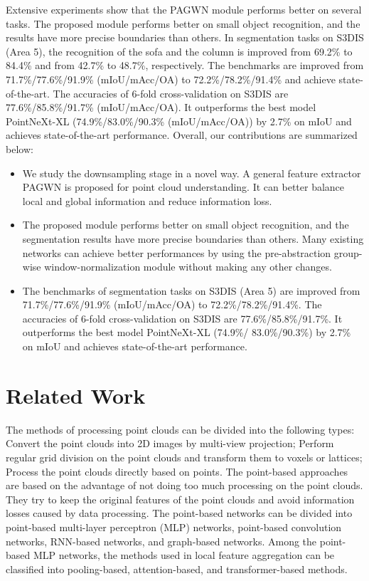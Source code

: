 \documentclass[10pt,twocolumn,letterpaper]{article}
\begin{document}
    Extensive experiments show that the PAGWN module performs better on several tasks.
    The proposed module performs better on small object recognition, and the results have more precise boundaries than others.
    In segmentation tasks on S3DIS (Area 5), the recognition of the sofa and the column is improved from 69.2\% to 84.4\% and from 42.7\% to 48.7\%, respectively.
    The benchmarks are improved from 71.7\%/77.6\%/91.9\% (mIoU/mAcc/OA) to 72.2\%/78.2\%/91.4\% and achieve state-of-the-art.
    The accuracies of 6-fold cross-validation on S3DIS are 77.6\%/85.8\%/91.7\% (mIoU/mAcc/OA). 
    It outperforms the best model PointNeXt-XL \cite{45https://doi.org/10.48550/arxiv.2206.04670} (74.9\%/83.0\%/90.3\% (mIoU/mAcc/OA)) by 2.7\% on mIoU and achieves state-of-the-art performance.
    Overall, our contributions are summarized below:
    \begin{itemize}
    \item We study the downsampling stage in a novel way. A general feature extractor PAGWN is proposed for point cloud understanding. It can better balance local and global information and reduce information loss.
    \item The proposed module performs better on small object recognition, and the segmentation results have more precise boundaries than others. Many existing networks can achieve better performances by using the pre-abstraction group-wise window-normalization module without making any other changes.
    \item The benchmarks of segmentation tasks on S3DIS (Area 5) are improved from 71.7\%/77.6\%/91.9\% (mIoU/mAcc/OA) to 72.2\%/78.2\%/91.4\%. The accuracies of 6-fold cross-validation on S3DIS are 77.6\%/85.8\%/91.7\%. It outperforms the best model PointNeXt-XL \cite{45https://doi.org/10.48550/arxiv.2206.04670} (74.9\%/ 83.0\%/90.3\%) by 2.7\% on mIoU and achieves state-of-the-art performance.
    \end{itemize}

\section{Related Work}

    The methods of processing point clouds can be divided into the following types: Convert the point clouds into 2D images by multi-view projection; Perform regular grid division on the point clouds and transform them to voxels or lattices; Process the point clouds directly based on points. The point-based approaches are based on the advantage of not doing too much processing on the point clouds. They try to keep the original features of the point clouds and avoid information losses caused by data processing. The point-based networks can be divided into point-based multi-layer perceptron (MLP) networks, point-based convolution networks, RNN-based networks, and graph-based networks. Among the point-based MLP networks, the methods used in local feature aggregation can be classified into pooling-based, attention-based, and transformer-based methods.
\end{document}
